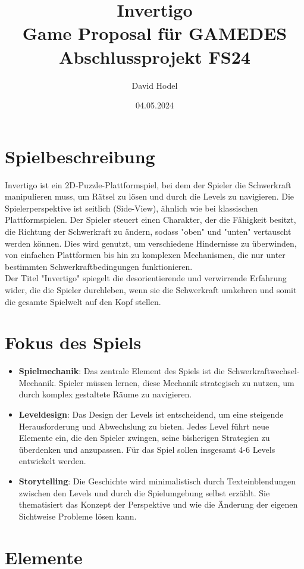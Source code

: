 \documentclass{article}
\title{%
Invertigo \\
\large Game Proposal für GAMEDES \\
  Abschlussprojekt FS24}
\author{David Hodel}
\date{04.05.2024}
\begin{document}
\maketitle
\newpage

\section{Spielbeschreibung}
Invertigo ist ein 2D-Puzzle-Plattformspiel, bei dem der Spieler die Schwerkraft manipulieren muss,
um Rätsel zu lösen und durch die Levels zu navigieren.
Die Spielerperspektive ist seitlich (Side-View), ähnlich wie bei klassischen Plattformspielen.
Der Spieler steuert einen Charakter,
der die Fähigkeit besitzt, die Richtung der Schwerkraft zu ändern, sodass "oben" und "unten" vertauscht werden können.
Dies wird genutzt, um verschiedene Hindernisse zu überwinden, von einfachen Plattformen bis hin zu komplexen Mechanismen,
die nur unter bestimmten Schwerkraftbedingungen funktionieren.
\\
Der Titel "Invertigo" spiegelt die desorientierende und verwirrende Erfahrung wider, die die Spieler durchleben,
wenn sie die Schwerkraft umkehren und somit die gesamte Spielwelt auf den Kopf stellen.

\section{Fokus des Spiels}

\begin{itemize}
    \item \textbf{Spielmechanik}: Das zentrale Element des Spiels ist die Schwerkraftwechsel-Mechanik.
    Spieler müssen lernen, diese Mechanik strategisch zu nutzen, um durch komplex gestaltete Räume zu navigieren.
    \item \textbf{Leveldesign}: Das Design der Levels ist entscheidend, um eine steigende Herausforderung und Abwechslung zu bieten.
    Jedes Level führt neue Elemente ein, die den Spieler zwingen, seine bisherigen Strategien zu überdenken und anzupassen.
    Für das Spiel sollen insgesamt 4-6 Levels entwickelt werden.
    \item \textbf{Storytelling}: Die Geschichte wird minimalistisch durch Texteinblendungen zwischen den Levels und durch die Spielumgebung selbst erzählt.
    Sie thematisiert das Konzept der Perspektive und wie die Änderung der eigenen Sichtweise Probleme lösen kann.
\end{itemize}

\section{Elemente}
\end{document}
